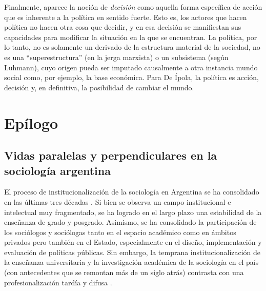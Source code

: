 {Finalmente, aparece la noción de \emph{decisión} como aquella forma específica de acción que es inherente a la política en sentido fuerte. Esto es, los actores que hacen política no hacen otra cosa que decidir, y en esa decisión se manifiestan sus capacidades para modificar la situación en la que se encuentran. La política, por lo tanto, no es solamente un derivado de la estructura material de la sociedad, no es una \enquote{superestructura} (en la jerga marxista) o un subsistema (según Luhmann), cuyo origen pueda ser imputado causalmente a otra instancia mundo social como, por ejemplo, la base económica. Para De Ípola, la política es acción, decisión y, en definitiva, la posibilidad de cambiar el mundo.

\backmatter

\chapter[Epílogo]{Epílogo}

\begin{center}
	\vspace{24pt}
\end{center}


\section*{Vidas paralelas y perpendiculares en la sociología argentina}

El proceso de institucionalización de la sociología en Argentina se ha consolidado en las últimas tres décadas \parencite{1664-PEREYRA2017,1923-PEREYRA2010}. Si bien se observa un campo institucional e intelectual muy fragmentado, se ha logrado en el largo plazo una estabilidad de la enseñanza de grado y posgrado. Asimismo, se ha consolidado la participación de los sociólogos y sociólogas tanto en el espacio académico como en ámbitos privados pero también en el Estado, especialmente en el diseño, implementación y evaluación de políticas públicas. Sin embargo, la temprana institucionalización de la enseñanza universitaria y la investigación académica de la sociología en el país (con antecedentes que se remontan más de un siglo atrás) contrasta con una profesionalización tardía y difusa \parencite{1512-SHILS1971}.

}
